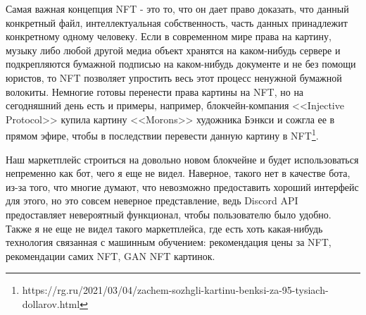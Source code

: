 Самая важная концепция NFT - это то, что он дает право доказать, что данный конкретный файл, интеллектуальная собственность, часть данных принадлежит конкретному одному человеку. Если в современном мире права на картину, музыку либо любой другой медиа объект хранятся на каком-нибудь сервере и подкрепляются бумажной подписью на каком-нибудь документе и не без помощи юристов, то NFT позволяет упростить весь этот процесс ненужной бумажной волокиты. Немногие готовы перенести права картины на NFT, но на сегодняшний день есть и примеры, например, блокчейн-компания <<Injective Protocol>> купила картину <<Morons>> художника Бэнкси и сожгла ее в прямом эфире, чтобы в последствии перевести данную картину в NFT\footnote{https://rg.ru/2021/03/04/zachem-sozhgli-kartinu-benksi-za-95-tysiach-dollarov.html}.

Наш маркетплейс строиться на довольно новом блокчейне и будет использоваться непременно как бот, чего я еще не видел. Наверное, такого нет в качестве бота, из-за того, что многие думают, что невозможно предоставить хороший интерфейс для этого, но это совсем неверное представление, ведь Discord API предоставляет невероятный функционал, чтобы пользователю было удобно. Также я не еще не видел такого маркетплейса, где есть хоть какая-нибудь технология связанная с машинным обучением: рекомендация цены за NFT, рекомендации самих NFT, GAN NFT картинок.